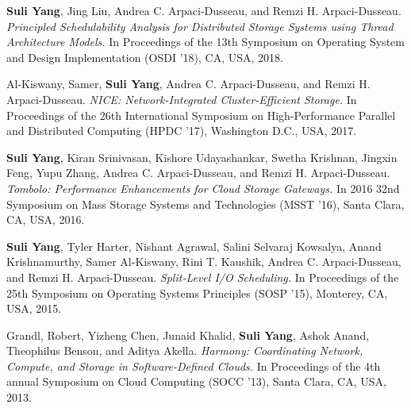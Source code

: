 \documentclass[10pt, letterpaper]{article}
\begin{document}
\begin{enumerate}[fullwidth,itemindent=1.1em,label={[\arabic*]}]


	\item {\bf Suli Yang}, Jing Liu, Andrea C. Arpaci-Dusseau, and Remzi H. Arpaci-Dusseau. \textit{Principled Schedulability Analysis for Distributed Storage Systems using Thread Architecture Models.}
        In Proceedings of the 13th Symposium on Operating System and Design Implementation (OSDI '18), CA, USA, 2018.

        \item Al-Kiswany, Samer, {\bf Suli Yang}, Andrea C. Arpaci-Dusseau, and Remzi H. Arpaci-Dusseau. \textit{NICE: Network-Integrated Cluster-Efficient Storage.}  
        In Proceedings of the 26th International Symposium on High-Performance Parallel and Distributed Computing (HPDC '17), Washington D.C., USA, 2017.

        \item {\bf Suli Yang}, Kiran Srinivasan, Kishore Udayashankar, Swetha Krishnan, Jingxin Feng, Yupu Zhang, Andrea C. Arpaci-Dusseau, and Remzi H. Arpaci-Dusseau. \textit{Tombolo: Performance Enhancements for Cloud Storage Gateways.} 
         In 2016 32nd Symposium on Mass Storage Systems and Technologies (MSST '16), Santa Clara, CA, USA, 2016.

         \item {\bf Suli Yang}, Tyler Harter, Nishant Agrawal, Salini Selvaraj Kowsalya, Anand Krishnamurthy, Samer Al-Kiswany, Rini T. Kaushik, Andrea C. Arpaci-Dusseau, and Remzi H. Arpaci-Dusseau. \textit{Split-Level I/O Scheduling.} 
         In Proceedings of the 25th Symposium on Operating Systems Principles (SOSP '15), Monterey, CA, USA, 2015.

         \item Grandl, Robert, Yizheng Chen, Junaid Khalid, {\bf Suli Yang}, Ashok Anand, Theophilus Benson, and Aditya Akella. \textit{Harmony: Coordinating Network, Compute, and Storage in Software-Defined Clouds.}
          In Proceedings of the 4th annual Symposium on Cloud Computing (SOCC '13), Santa Clara, CA, USA, 2013.

\end{enumerate}


\end{document}
